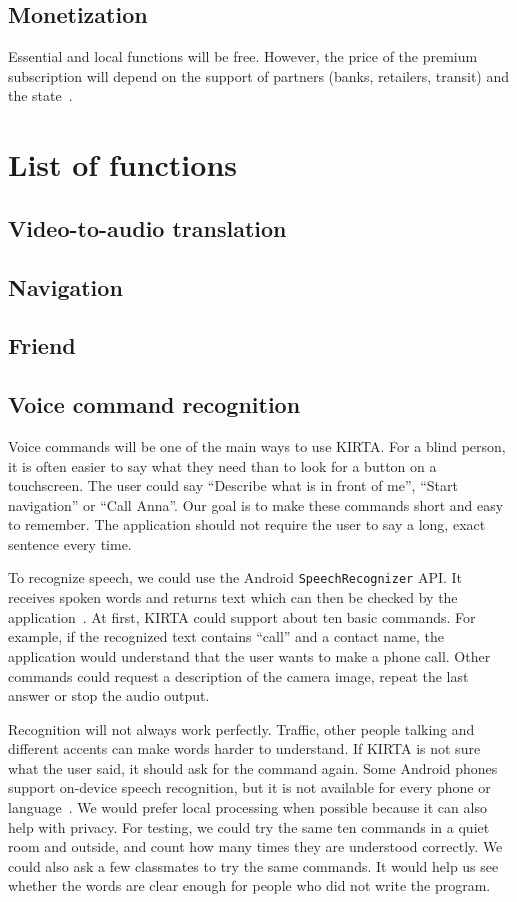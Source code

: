 \documentclass[10pt,twoside,english,a4paper]{article}
\begin{document}
\subsection*{Monetization}


Essential and local functions will be free. However, the price of the premium subscription will depend on the support of partners (banks, retailers, transit) and the state~\cite{eaa}.

\section*{List of functions}
\subsection*{Video-to-audio translation}
\subsection*{Navigation}
\subsection*{Friend}

\subsection*{Voice command recognition}

Voice commands will be one of the main ways to use KIRTA. For a blind person, it is often easier to say what they need than to look for a button on a touchscreen. The user could say ``Describe what is in front of me'', ``Start navigation'' or ``Call Anna''. Our goal is to make these commands short and easy to remember. The application should not require the user to say a long, exact sentence every time.

To recognize speech, we could use the Android \texttt{SpeechRecognizer} API. It receives spoken words and returns text which can then be checked by the application~\cite{androidspeech}. At first, KIRTA could support about ten basic commands. For example, if the recognized text contains ``call'' and a contact name, the application would understand that the user wants to make a phone call. Other commands could request a description of the camera image, repeat the last answer or stop the audio output.

Recognition will not always work perfectly. Traffic, other people talking and different accents can make words harder to understand. If KIRTA is not sure what the user said, it should ask for the command again. Some Android phones support on-device speech recognition, but it is not available for every phone or language~\cite{androidspeech}. We would prefer local processing when possible because it can also help with privacy. For testing, we could try the same ten commands in a quiet room and outside, and count how many times they are understood correctly. We could also ask a few classmates to try the same commands. It would help us see whether the words are clear enough for people who did not write the program.
\end{document}
